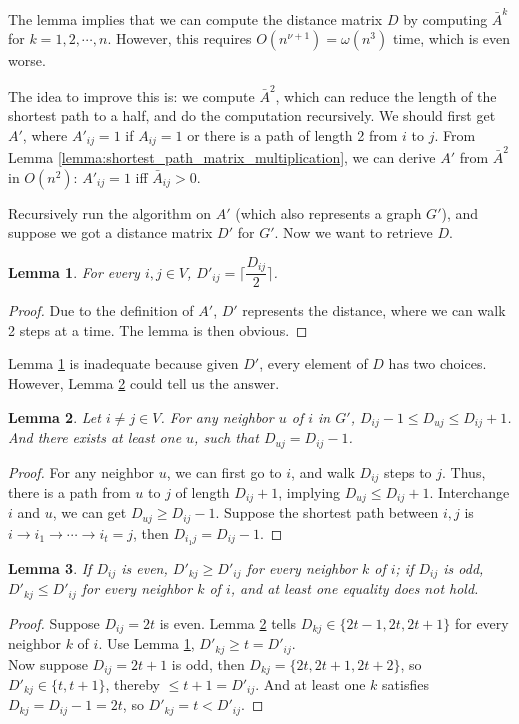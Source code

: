 \documentclass[11pt]{article}
\theoremstyle{plain}
\newtheorem{lemma}{Lemma}[section]
\begin{document}
The lemma implies that we can compute the distance matrix $D$ by computing $\bar{A}^k$ for $k=1,2,\cdots,n$. However, this requires $O(n^{\nu+1})=\omega(n^3)$ time, which is even worse.

The idea to improve this is: we compute $\bar A^2$, which can reduce the length of the shortest path to a half, and do the computation recursively. We should first get $A'$, where $A'_{ij}=1$ if $A_{ij}=1$ or there is a path of length 2 from $i$ to $j$. From Lemma \ref{lemma:shortest_path_matrix_multiplication}, we can derive $A'$ from $\bar A^2$ in $O(n^2)$: $A'_{ij}=1$ iff $\bar A_{ij}>0$.

Recursively run the algorithm on $A'$ (which also represents a graph $G'$), and suppose we got a distance matrix $D'$ for $G'$. Now we want to retrieve $D$.

\begin{lemma}
\label{2}
For every $i,j\in V$, $D'_{ij}=\lceil\dfrac{D_{ij}}{2}\rceil$.
\end{lemma}
\begin{proof}
Due to the definition of $A'$, $D'$ represents the distance, where we can walk 2 steps at a time. The lemma is then obvious.
\end{proof}

Lemma \ref{2} is inadequate because given $D'$, every element of $D$ has two choices. However, Lemma \ref{3} could tell us the answer.
\begin{lemma}
\label{3}
Let $i\not=j \in V$. For any neighbor $u$ of $i$ in $G'$, $D_{ij}-1\le D_{uj}\le D_{ij}+1$. And there exists at least one $u$, such that $D_{uj}=D_{ij}-1$.
\end{lemma}
\begin{proof}
For any neighbor $u$, we can first go to $i$, and walk $D_{ij}$ steps to $j$. Thus, there is a path from $u$ to $j$ of length $D_{ij}+1$, implying $D_{uj}\le D_{ij}+1$. Interchange $i$ and $u$, we can get $D_{uj}\ge D_{ij}-1$. Suppose the shortest path between $i,j$ is $i\to i_1\to\cdots\to i_t=j$, then $D_{i_1j}=D_{ij}-1$.
\end{proof}

\begin{lemma}
\label{4}
If $D_{ij}$ is even, $D'_{kj}\ge D'_{ij}$ for every neighbor $k$ of $i$; if $D_{ij}$ is odd, $D'_{kj}\le D'_{ij}$ for every neighbor $k$ of $i$, and at least one equality does not hold.
\end{lemma}
\begin{proof}
Suppose $D_{ij}=2t$ is even. Lemma \ref{3} tells $D_{kj}\in\{2t-1,2t,2t+1\}$ for every neighbor $k$ of $i$. Use Lemma \ref{2}, $D'_{kj}\ge t=D'_{ij}$. \\
Now suppose $D_{ij}=2t+1$ is odd, then $D_{kj}=\{2t,2t+1,2t+2\}$, so $D'_{kj}\in \{t,t+1\}$, thereby $\le t+1=D'_{ij}$. And at least one $k$ satisfies $D_{kj}=D_{ij}-1=2t$, so $D'_{kj}=t<D'_{ij}$.
\end{proof}
\end{document}
